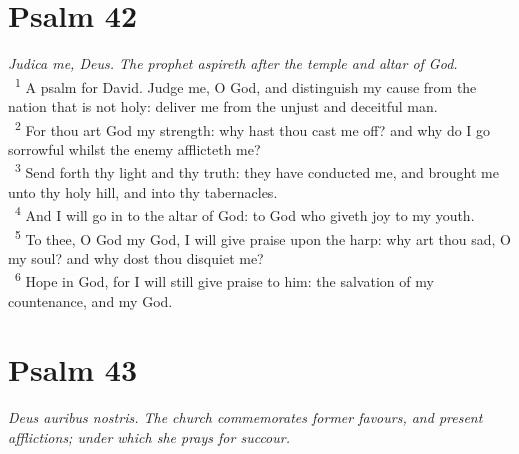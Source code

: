 \documentclass[a5paper,12pt]{article}
\begin{document}
\begin{multicols*}{2}
\section{Psalm 42}
\label{sec:orgac97c75}
\emph{Judica me, Deus. The prophet aspireth after the temple and altar of God.}\\

~\textsuperscript{1} A psalm for David. Judge me, O God, and distinguish my cause from the nation that is not holy: deliver me from the unjust and deceitful man.\\
~\textsuperscript{2} For thou art God my strength: why hast thou cast me off? and why do I go sorrowful whilst the enemy afflicteth me?\\
~\textsuperscript{3} Send forth thy light and thy truth: they have conducted me, and brought me unto thy holy hill, and into thy tabernacles.\\
~\textsuperscript{4} And I will go in to the altar of God: to God who giveth joy to my youth.\\
~\textsuperscript{5} To thee, O God my God, I will give praise upon the harp: why art thou sad, O my soul? and why dost thou disquiet me?\\
~\textsuperscript{6} Hope in God, for I will still give praise to him: the salvation of my countenance, and my God.\\

\section{Psalm 43}
\label{sec:org3de91e8}
\emph{Deus auribus nostris. The church commemorates former favours, and present afflictions; under which she prays for succour.}\\


\end{multicols*}
\end{document}
